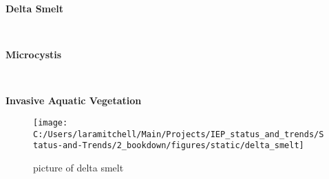 \documentclass[
]{book}
\begin{document}
\begin{panel-grid}

\begin{columns-nocenter}

\begin{column800}

\textbf{Delta Smelt}

\end{column800}

\begin{column40}

~

\end{column40}

\begin{column800}

\textbf{Microcystis}

\end{column800}

\begin{column40}

~

\end{column40}

\begin{column800}

\textbf{Invasive Aquatic Vegetation}

\end{column800}

\end{columns-nocenter}

\begin{columns-nocenter}

\begin{column800}

\begin{figure}

{\centering \texttt{[image: C:/Users/laramitchell/Main/Projects/IEP\_status\_and\_trends/Status-and-Trends/2\_bookdown/figures/static/delta\_smelt]} 

}

\caption{picture of delta smelt}\label{fig:unnamed-chunk-85}
\end{figure}

\end{column800}

\begin{column40}

~

\end{column40}


\end{columns-nocenter}
\end{panel-grid}
\end{document}
